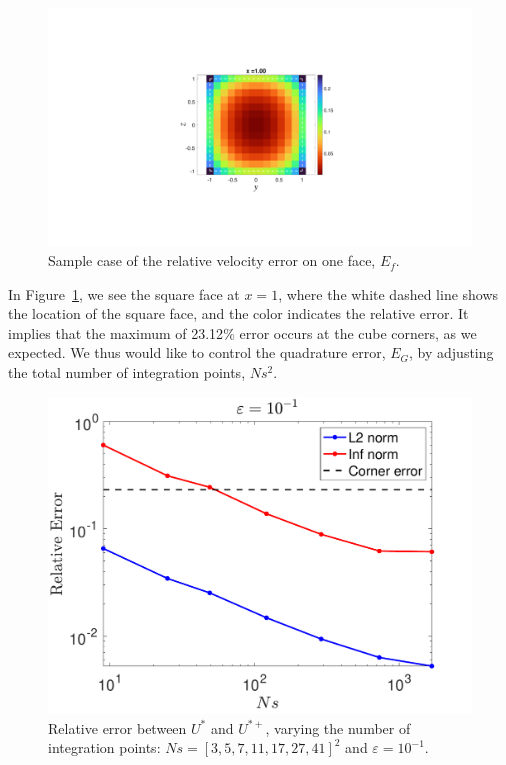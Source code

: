 \begin{figure}[h]
	\begin{center}
		\includegraphics[scale=0.3]{./figures/fig_corner_err}
	\caption{Sample case of the relative velocity error on one face, $E_f$.}
	\label{fig_corner_err}
\end{center}
\end{figure}
In Figure~\ref{fig_corner_err}, we see the square face at $x = 1$, where the white dashed line shows the location of the square face, and the color indicates the relative error. It implies that the maximum of 23.12$\%$ error occurs at the cube corners, as we expected. We thus would like to control the quadrature error, $E_G$, by adjusting the total number of integration points, $Ns^2$.
\begin{figure}[ht]
	\begin{center}
		\includegraphics[scale=0.4]{./figures/fig_Ef_Eg_ep-1}
	\caption{Relative error between $U^*$ and $U^{*+}$, varying the number of integration points: $Ns = [3, 5, 7, 11, 17, 27,41]^2$ and $\varepsilon = 10^{-1}$.}
	\label{fig_Ef_EG_compare}
\end{center}
\end{figure}
